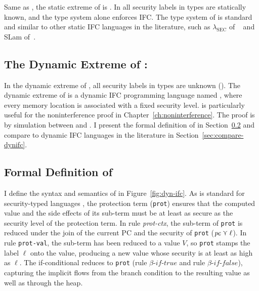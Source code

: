 Same as \GSLRef, the static extreme of \Surface is \SSLRef. In \SSLRef all
security labels in types are statically known, and the type system alone
enforces IFC. The type system of \SSLRef is standard and similar to other static
IFC languages in the literature, such as $\lambda_{\text{SEC}}$ of
~\textcite{zdancewic2002programming} and SLam of~\textcite{heintze1998slam}.

\subsection{The Dynamic Extreme of \Surface: \DynIFC}

In the dynamic extreme of \GSLRef, all security labels in types are unknown
(\unk). The dynamic extreme of \GSLRef is a dynamic IFC programming language
named \DynIFC, where every memory location is associated with a fixed security
level. \DynIFC is particularly useful for the noninterference proof in
Chapter~\ref{ch:noninterference}. The proof is by simulation between \CC and
\DynIFC. I present the formal definition of \DynIFC in
Section~\ref{sec:def-dynifc} and compare \DynIFC to dynamic IFC languages in the
literature in Section~\ref{sec:compare-dynifc}.

\subsection{Formal Definition of \DynIFC}
\label{sec:def-dynifc}

I define the syntax and semantics of \DynIFC in Figure~\ref{fig:dyn-ifc}. As is
standard for security-typed languages \parencite{heintze1998slam,
  Fennell:2013ab, Toro:2018aa}, the protection term (\texttt{prot}) ensures that
the computed value and the side effects of its sub-term must be at least as
secure as the security level of the protection term. In rule \textit{prot-ctx},
the sub-term of \texttt{prot} is reduced under the join of the current PC and
the security of \texttt{prot} ($\mathit{pc} \curlyvee \ell$). In rule \texttt{prot-val},
the sub-term has been reduced to a value $V$, so \texttt{prot} stamps the label
$\ell$ onto the value, producing a new value whose security is at least as high
as $\ell$. The if-conditional reduces to \texttt{prot} (rule
$\beta\textit{-if-true}$ and rule $\beta\textit{-if-false}$), capturing the
implicit flows from the branch condition to the resulting value as well as
through the heap.

